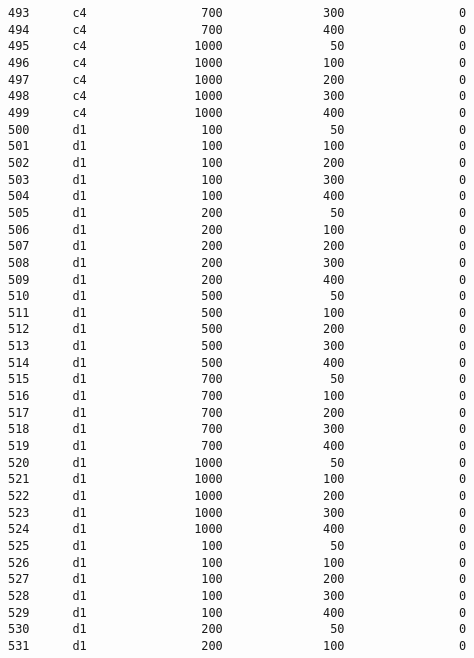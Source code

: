 \documentclass[11pt]{article}
\begin{document}
\begin{Verbatim}[commandchars=\\\{\}]
493      c4                700              300                0   
494      c4                700              400                0   
495      c4               1000               50                0   
496      c4               1000              100                0   
497      c4               1000              200                0   
498      c4               1000              300                0   
499      c4               1000              400                0   
500      d1                100               50                0   
501      d1                100              100                0   
502      d1                100              200                0   
503      d1                100              300                0   
504      d1                100              400                0   
505      d1                200               50                0   
506      d1                200              100                0   
507      d1                200              200                0   
508      d1                200              300                0   
509      d1                200              400                0   
510      d1                500               50                0   
511      d1                500              100                0   
512      d1                500              200                0   
513      d1                500              300                0   
514      d1                500              400                0   
515      d1                700               50                0   
516      d1                700              100                0   
517      d1                700              200                0   
518      d1                700              300                0   
519      d1                700              400                0   
520      d1               1000               50                0   
521      d1               1000              100                0   
522      d1               1000              200                0   
523      d1               1000              300                0   
524      d1               1000              400                0   
525      d1                100               50                0   
526      d1                100              100                0   
527      d1                100              200                0   
528      d1                100              300                0   
529      d1                100              400                0   
530      d1                200               50                0   
531      d1                200              100                0   

\end{Verbatim}
\end{document}
